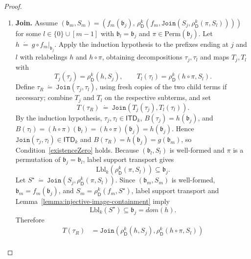 \documentclass[11pt,a4paper]{article}
\newcommand{\treewidthvalue}{k}
\newcommand{\abag}{\mathfrak{b}}
\newcommand{\jointype}{\mathtt{Join}}
\newcommand{\topbagname}{B}
\newcommand{\topbag}[1]{\topbagname(#1)}
\newcommand{\allabstractdecompositionstreewidth}[1]{\mathsf{ITD}_{#1}}
\newcommand{\abstractdecomposition}{\tau}
\newcommand{\defeq}{~\dot{=}~}
\newcommand{\dpcore}{\mathsf{D}}
\newcommand{\witnessset}{S}
\newcommand{\domain}{dom}
\newcommand{\dprefutation}{R}
\newcommand{\subtermToBag}{T}
\newcommand{\relabelingfunction}{f}
\newcommand{\action}{\rho}
\begin{document}
\begin{proof}
\begin{enumerate}
\item \textbf{Join.}
Assume $(\abag_m,\witnessset_m)=(\relabelingfunction_m(\abag_j),\,\action_{\dpcore}^{\treewidthvalue}(\relabelingfunction_m,\jointype(\witnessset_j,\action_{\dpcore}^{\treewidthvalue}(\pi,\witnessset_l))))$ for some $l\in \{0\}\cup[m-1]$ with $\abag_l=\abag_j$ and $\pi\in\mathrm{Perm}(\abag_j)$.
Let $h\defeq g\circ \relabelingfunction_m|_{\abag_j}$.
Apply the induction hypothesis to the prefixes ending at $j$ and $l$ with relabelings $h$ and $h\circ \pi$, obtaining decompositions $\abstractdecomposition_j,\abstractdecomposition_l$ and maps $\subtermToBag_j,\subtermToBag_l$ with
\[
\subtermToBag_j(\abstractdecomposition_j)=\action_{\dpcore}^{\treewidthvalue}(h,\witnessset_j),
\qquad
\subtermToBag_l(\abstractdecomposition_l)=\action_{\dpcore}^{\treewidthvalue}(h\circ \pi,\witnessset_l).
\]
Define $\abstractdecomposition_{\dprefutation}\defeq \jointype(\abstractdecomposition_j,\abstractdecomposition_l)$, using fresh copies of the two child terms if necessary; combine $\subtermToBag_j$ and $\subtermToBag_l$ on the respective subterms, and set
\[
\subtermToBag(\abstractdecomposition_{\dprefutation}) \defeq \jointype(\subtermToBag_j(\abstractdecomposition_j),\subtermToBag_l(\abstractdecomposition_l)).
\]
By the induction hypothesis, $\abstractdecomposition_j,\abstractdecomposition_l\in \allabstractdecompositionstreewidth{\treewidthvalue}$, $\topbag{\abstractdecomposition_j}=h(\abag_j)$, and $\topbag{\abstractdecomposition_l}=(h\circ \pi)(\abag_l)=(h\circ \pi)(\abag_j)=h(\abag_j)$.
Hence $\jointype(\abstractdecomposition_j,\abstractdecomposition_l)\in \allabstractdecompositionstreewidth{\treewidthvalue}$ and $\topbag{\abstractdecomposition_{\dprefutation}}=h(\abag_j)=g(\abag_m)$, so Condition~\ref{existenceZero} holds.
Because $(\abag_l,\witnessset_l)$ is well-formed and $\pi$ is a permutation of $\abag_j=\abag_l$, label support transport gives
\[
\mathrm{Lbl}_{\treewidthvalue}(\action_{\dpcore}^{\treewidthvalue}(\pi,\witnessset_l))\subseteq \abag_j.
\]
Let $S^\star\defeq \jointype(\witnessset_j,\action_{\dpcore}^{\treewidthvalue}(\pi,\witnessset_l))$.
Since $(\abag_m,\witnessset_m)$ is well-formed, $\abag_m=\relabelingfunction_m(\abag_j)$, and $\witnessset_m=\action_{\dpcore}^{\treewidthvalue}(\relabelingfunction_m,S^\star)$, label support transport and Lemma~\ref{lemma:injective-image-containment} imply
\[
\mathrm{Lbl}_{\treewidthvalue}(S^\star)\subseteq \abag_j=\domain(h).
\]
Therefore
\[
\begin{aligned}
\subtermToBag(\abstractdecomposition_{\dprefutation})
&= \jointype(\action_{\dpcore}^{\treewidthvalue}(h,\witnessset_j),\action_{\dpcore}^{\treewidthvalue}(h\circ \pi,\witnessset_l))\\

\end{aligned}\]
\end{enumerate}
\end{proof}
\end{document}
